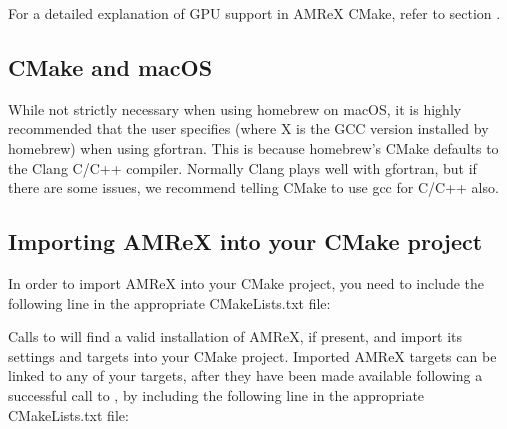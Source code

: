 \documentclass[letterpaper,10pt,english]{sphinxmanual}
\begin{document}
\sphinxAtStartPar
For a detailed explanation of GPU support in AMReX CMake, refer to section {\hyperref[\detokenize{GPU:sec-gpu-build}]{}}.


\subsection{CMake and macOS}
\label{\detokenize{BuildingAMReX:cmake-and-macos}}
\sphinxAtStartPar
While not strictly necessary when using homebrew on macOS, it is highly
recommended that the user specifies  (where X is the GCC version installed by homebrew) when using
gfortran. This is because homebrew’s CMake defaults to the Clang C/C++
compiler. Normally Clang plays well with gfortran, but if there are some issues,
we recommend telling CMake to use gcc for C/C++ also.


\subsection{Importing AMReX into your CMake project}
\label{\detokenize{BuildingAMReX:importing-amrex-into-your-cmake-project}}\label{\detokenize{BuildingAMReX:sec-build-cmake-config}}
\sphinxAtStartPar
In order to import AMReX into your CMake project, you need
to include the following line in the appropriate CMakeLists.txt file:

\begin{sphinxVerbatim}[commandchars=\\\{\}]
\end{sphinxVerbatim}

\sphinxAtStartPar
Calls to  will find a valid installation of AMReX, if present,
and import its settings and targets into your CMake project.
Imported AMReX targets can be linked to any of your targets, after they have been made available
following a successful call to , by including
the following line in the appropriate CMakeLists.txt file:

\begin{sphinxVerbatim}[commandchars=\\\{\}]
    
\end{sphinxVerbatim}
\end{document}
